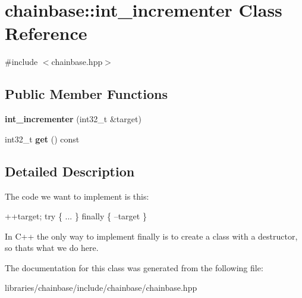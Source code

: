 \hypertarget{classchainbase_1_1int__incrementer}{}\section{chainbase\+:\+:int\+\_\+incrementer Class Reference}
\label{classchainbase_1_1int__incrementer}


{\ttfamily \#include $<$chainbase.\+hpp$>$}

\subsection*{Public Member Functions}
\begin{DoxyCompactItemize}
\item 
\mbox{\label{classchainbase_1_1int__incrementer_aaaca8550f525722150a6ab6429979c00}} 
{\bfseries int\+\_\+incrementer} (int32\+\_\+t \&target)
\item 
\mbox{\label{classchainbase_1_1int__incrementer_a820e57f55564be8450cd2597147da56f}} 
int32\+\_\+t {\bfseries get} () const
\end{DoxyCompactItemize}


\subsection{Detailed Description}
The code we want to implement is this\+:

++target; try \{ ... \} finally \{ --target \}

In C++ the only way to implement finally is to create a class with a destructor, so that\textquotesingle{}s what we do here. 

The documentation for this class was generated from the following file\+:\begin{DoxyCompactItemize}
\item 
libraries/chainbase/include/chainbase/chainbase.\+hpp\end{DoxyCompactItemize}
